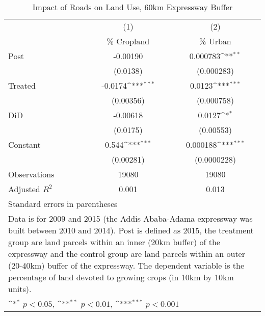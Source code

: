 \begin{table}[htbp]\centering
\def\sym#1{\ifmmode^{#1}\else\(^{#1}\)\fi}
\caption{Impact of Roads on Land Use, 60km Expressway Buffer}
\begin{tabular}{l*{2}{c}}
\hline\hline
                    &\multicolumn{1}{c}{(1)}&\multicolumn{1}{c}{(2)}\\
                    &\multicolumn{1}{c}{\% Cropland}&\multicolumn{1}{c}{\% Urban}\\
\hline
Post                &    -0.00190         &    0.000783\sym{**} \\
                    &    (0.0138)         &  (0.000283)         \\
[1em]
Treated             &     -0.0174\sym{***}&      0.0123\sym{***}\\
                    &   (0.00356)         &  (0.000758)         \\
[1em]
DiD                 &    -0.00618         &      0.0127\sym{*}  \\
                    &    (0.0175)         &   (0.00553)         \\
[1em]
Constant            &       0.544\sym{***}&    0.000188\sym{***}\\
                    &   (0.00281)         & (0.0000228)         \\
\hline
Observations        &       19080         &       19080         \\
Adjusted \(R^{2}\)  &       0.001         &       0.013         \\
\hline\hline
\multicolumn{3}{l}{\footnotesize Standard errors in parentheses}\\
\multicolumn{3}{l}{\footnotesize Data is for 2009 and 2015 (the Addis Ababa-Adama expressway was built between 2010 and 2014). Post is defined as 2015, the treatment group are land parcels within an inner (20km buffer) of the expressway and the control group are land parcels within an outer (20-40km) buffer of the expressway. The dependent variable is the percentage of land devoted to growing crops (in 10km by 10km units).}\\
\multicolumn{3}{l}{\footnotesize \sym{*} \(p<0.05\), \sym{**} \(p<0.01\), \sym{***} \(p<0.001\)}\\
\end{tabular}
\end{table}
